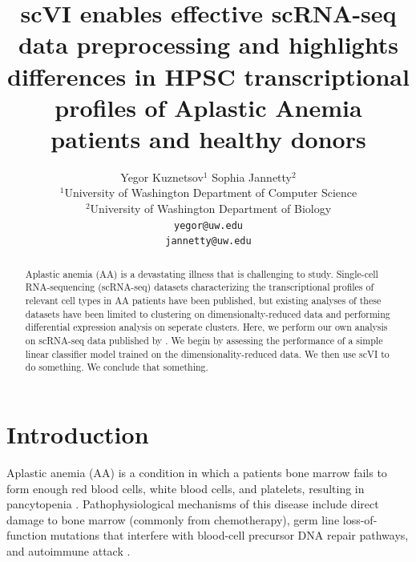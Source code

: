 \documentclass{article}
\title{scVI enables effective scRNA-seq data preprocessing and highlights differences in HPSC transcriptional profiles of Aplastic Anemia patients and healthy donors}
\author{%
Yegor Kuznetsov$^{1}$ \quad Sophia Jannetty$^{2}$\\
$^1$University of Washington Department of Computer Science\\
$^2$University of Washington Department of Biology\\
\texttt{yegor@uw.edu}\\
\texttt{jannetty@uw.edu}\\
}
\begin{document}
\maketitle


\begin{abstract}
  Aplastic anemia (AA) is a devastating illness that is challenging to study.
  Single-cell RNA-sequencing (scRNA-seq) datasets characterizing the transcriptional profiles of relevant cell types in AA patients have been published, but existing analyses of these datasets have been limited to clustering on dimensionalty-reduced data and performing differential expression analysis on seperate clusters.
  Here, we perform our own analysis on scRNA-seq data published by \citet{tonglin_single-cell_2022}.
  We begin by assessing the performance of a simple linear classifier model trained on the dimensionality-reduced data.
  We then use scVI to do something.
  We conclude that something.
\end{abstract}


\section{Introduction}

Aplastic anemia (AA) is a condition in which a patient\textquotesingle s bone marrow fails to form enough red blood cells, white blood cells, and platelets, resulting in pancytopenia \citep{young_aplastic_2018}.
Pathophysiological mechanisms of this disease include direct damage to bone marrow (commonly from chemotherapy), germ line loss-of-function mutations that interfere with blood-cell precursor DNA repair pathways, and autoimmune attack \citep{young_aplastic_2018}. 
\end{document}
